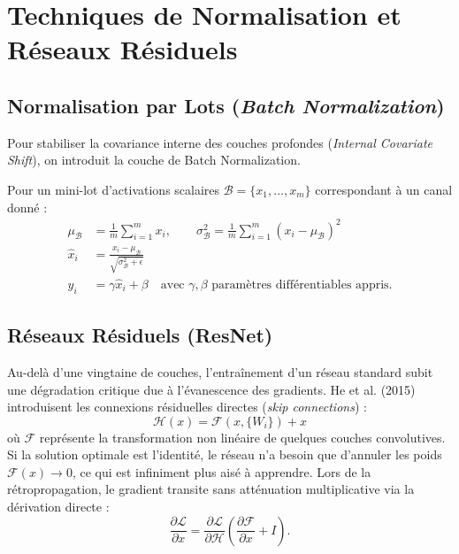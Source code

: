 
\section{Techniques de Normalisation et Réseaux Résiduels}

\subsection{Normalisation par Lots (\emph{Batch Normalization})}

Pour stabiliser la covariance interne des couches profondes (\emph{Internal Covariate Shift}), on introduit la couche de Batch Normalization.
\begin{definition}
    Pour un mini-lot d'activations scalaires $\mathcal{B} = \{x_1, \dots, x_m\}$ correspondant à un canal donné :
    \begin{align}
        \mu_{\mathcal{B}} &= \frac{1}{m} \sum_{i=1}^m x_i, \qquad \sigma_{\mathcal{B}}^2 = \frac{1}{m} \sum_{i=1}^m (x_i - \mu_{\mathcal{B}})^2 \\
        \hat{x}_i &= \frac{x_i - \mu_{\mathcal{B}}}{\sqrt{\sigma_{\mathcal{B}}^2 + \epsilon}} \\
        y_i &= \gamma \hat{x}_i + \beta \quad \text{avec } \gamma, \beta \text{ paramètres différentiables appris.}
    \end{align}
\end{definition}

\subsection{Réseaux Résiduels (ResNet)}

Au-delà d'une vingtaine de couches, l'entraînement d'un réseau standard subit une dégradation critique due à l'évanescence des gradients. He et al. (2015) introduisent les connexions résiduelles directes (\emph{skip connections}) :
\begin{equation}
    \mathcal{H}(x) = \mathcal{F}(x, \{W_i\}) + x
\end{equation}
où $\mathcal{F}$ représente la transformation non linéaire de quelques couches convolutives. Si la solution optimale est l'identité, le réseau n'a besoin que d'annuler les poids $\mathcal{F}(x) \to 0$, ce qui est infiniment plus aisé à apprendre. Lors de la rétropropagation, le gradient transite sans atténuation multiplicative via la dérivation directe :
\begin{equation}
    \frac{\partial \mathcal{L}}{\partial x} = \frac{\partial \mathcal{L}}{\partial \mathcal{H}} \left( \frac{\partial \mathcal{F}}{\partial x} + I \right).
\end{equation}

